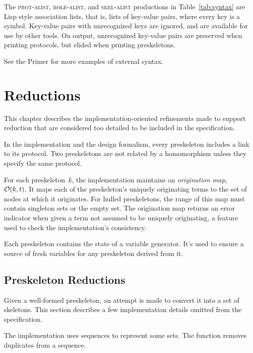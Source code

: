 \documentclass[12pt]{report}
\theoremstyle{definition}
\begin{document}
The \textsc{prot-alist}, \textsc{role-alist}, and \textsc{skel-alist}
productions in Table~\ref{tab:syntax} are Lisp style association lists,
that is, lists of key-value pairs, where every key is a symbol.
Key-value pairs with unrecognized keys are ignored, and are available
for use by other tools.  On output, unrecognized key-value pairs are
preserved when printing protocols, but elided when printing
preskeletons.

See the {\cpsa} Primer for more examples of {\cpsa} external syntax.

\chapter{Reductions}\label{cha:reductions}

This chapter describes the implementation-oriented refinements made to
support reduction that are considered too detailed to be included in
the specification.

In the {\cpsa} implementation and the design formalism, every
preskeleton includes a link to its protocol.  Two preskeletons are not
related by a homomorphism unless they specify the same protocol.

For each preskeleton~$k$, the implementation maintains an
 \emph{origination map}, $\mathcal{O}(k,t)$.  It maps
each of the preskeleton's uniquely originating terms to the set of
nodes at which it originates.  For hulled preskeletons, the range of
this map must contain singleton sets or the empty set.  The
origination map returns an error indicator when given a term not assumed
to be uniquely originating, a feature used to check the
implementation's consistency.

Each preskeleton contains the state of a variable generator.  It's
used to ensure a source of fresh variables for any preskeleton derived
from it.

\section{Preskeleton Reductions}\label{sec:preskeleton reductions}

Given a well-formed preskeleton, an attempt is made to convert it into
a set of skeletons.  This section describes a few implementation
details omitted from the specification.

The implementation uses sequences to represent some sets.  The
function  removes duplicates from a sequence.
\end{document}
